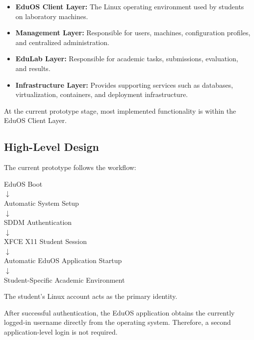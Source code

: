 \documentclass{tietreport}
\begin{document}
\begin{itemize}

    \item \textbf{EduOS Client Layer:}
    The Linux operating environment used by students on laboratory
    machines.

    \item \textbf{Management Layer:}
    Responsible for users, machines, configuration profiles, and
    centralized administration.

    \item \textbf{EduLab Layer:}
    Responsible for academic tasks, submissions, evaluation, and
    results.

    \item \textbf{Infrastructure Layer:}
    Provides supporting services such as databases, virtualization,
    containers, and deployment infrastructure.

\end{itemize}

At the current prototype stage, most implemented functionality is
within the EduOS Client Layer.

\subsection{High-Level Design}

The current prototype follows the workflow:

\begin{center}
EduOS Boot \\[2mm]
$\downarrow$ \\[2mm]
Automatic System Setup \\[2mm]
$\downarrow$ \\[2mm]
SDDM Authentication \\[2mm]
$\downarrow$ \\[2mm]
XFCE X11 Student Session \\[2mm]
$\downarrow$ \\[2mm]
Automatic EduOS Application Startup \\[2mm]
$\downarrow$ \\[2mm]
Student-Specific Academic Environment
\end{center}

The student's Linux account acts as the primary identity.

After successful authentication, the EduOS application obtains the
currently logged-in username directly from the operating system.
Therefore, a second application-level login is not required.
\end{document}
